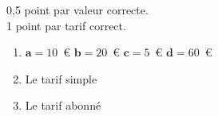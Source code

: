 %
%
    0,5 point par valeur correcte.\\
    1 point par tarif correct.
    \begin{enumerate}
        \item $\bm{a} = 10$~€\hfill
              $\bm{b} = 20$~€\hfill
              $\bm{c} = 5$~€\hfill
              $\bm{d} = 60$~€
        \item Le tarif simple
        \item Le tarif abonné
    \end{enumerate}
